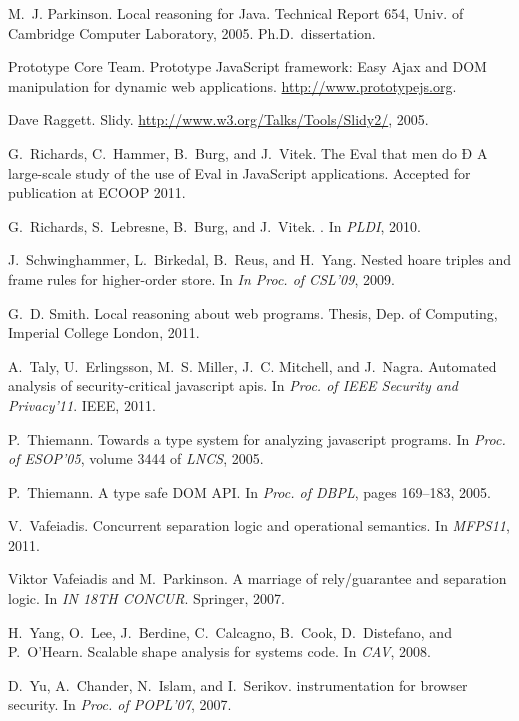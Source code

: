 \documentclass{article}
\begin{document}
{\begin{thebibliography}{10}
M.~J. Parkinson.
\newblock Local reasoning for {Java}.
\newblock Technical Report 654, Univ. of Cambridge Computer Laboratory, 2005.
\newblock Ph.D.\ dissertation.

{Prototype Core Team}.
\newblock Prototype {JavaScript} framework: {E}asy {A}jax and {DOM}
  manipulation for dynamic web applications.
\newblock \url{http://www.prototypejs.org}.

Dave Raggett.
 {S}lidy.
\newblock \url{http://www.w3.org/Talks/Tools/Slidy2/}, 2005.

G.~Richards, C.~Hammer, B.~Burg, and J.~Vitek.
\newblock The {E}val that men do Ð {A} large-scale study of the use of {E}val
  in {JavaScript} applications.
\newblock Accepted for publication at ECOOP 2011.

G.~Richards, S.~Lebresne, B.~Burg, and J.~Vitek.
.
\newblock In {\em PLDI}, 2010.

J.~Schwinghammer, L.~Birkedal, B.~Reus, and H.~Yang.
\newblock Nested hoare triples and frame rules for higher-order store.
\newblock In {\em In Proc. of CSL'09}, 2009.

G.~D. Smith.
\newblock Local reasoning about web programs.
 Thesis, Dep. of Computing, Imperial College London, 2011.

A.~Taly, U.~Erlingsson, M.~S. Miller, J.~C. Mitchell, and J.~Nagra.
\newblock Automated analysis of security-critical javascript apis.
\newblock In {\em Proc. of {IEEE Security and Privacy}'11}. IEEE, 2011.

P.~Thiemann.
\newblock Towards a type system for analyzing javascript programs.
\newblock In {\em Proc. of ESOP'05}, volume 3444 of {\em LNCS}, 2005.

P.~Thiemann.
\newblock A type safe {DOM API}.
\newblock In {\em Proc. of DBPL}, pages 169--183, 2005.

V.~Vafeiadis.
\newblock Concurrent separation logic and operational semantics.
\newblock In {\em MFPS11}, 2011.

Viktor Vafeiadis and M.~Parkinson.
\newblock A marriage of rely/guarantee and separation logic.
\newblock In {\em IN 18TH CONCUR}. Springer, 2007.

H.~{\!Y}ang, O.~{\!L}ee, J.~Berdine, C.~{\!C}alcagno, B.~{\!C}ook,
  D.~{\!D}istefano, and P.~{\!O}'Hearn.
\newblock Scalable shape analysis for systems code.
\newblock In {\em CAV}, 2008.

D.~Yu, A.~Chander, N.~Islam, and I.~Serikov.
 instrumentation for browser security.
\newblock In {\em Proc. of POPL'07}, 2007.

\end{thebibliography}
}
\end{document}
